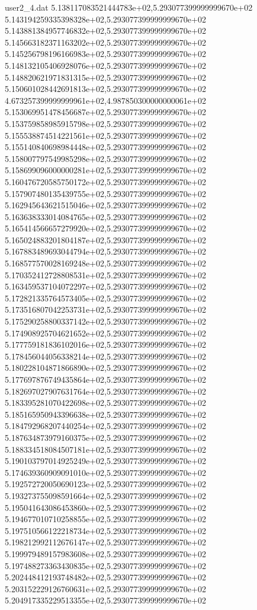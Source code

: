 \begin{filecontents}{user2_4.dat}
5.138117083521444783e+02,5.293077399999999670e+02
5.143194259335398328e+02,5.293077399999999670e+02
5.143881384957746832e+02,5.293077399999999670e+02
5.145663182371163202e+02,5.293077399999999670e+02
5.145256798196166983e+02,5.293077399999999670e+02
5.148132105406928076e+02,5.293077399999999670e+02
5.148820621971831315e+02,5.293077399999999670e+02
5.150601028442691813e+02,5.293077399999999670e+02
4.673257399999999961e+02,4.987850300000000061e+02
5.153069951478456687e+02,5.293077399999999670e+02
5.153759858985915798e+02,5.293077399999999670e+02
5.155538874514221561e+02,5.293077399999999670e+02
5.155140840698984448e+02,5.293077399999999670e+02
5.158007797549985298e+02,5.293077399999999670e+02
5.158699096000000281e+02,5.293077399999999670e+02
5.160476720585750172e+02,5.293077399999999670e+02
5.157907480135439755e+02,5.293077399999999670e+02
5.162945643621515046e+02,5.293077399999999670e+02
5.163638333014084765e+02,5.293077399999999670e+02
5.165414566657279920e+02,5.293077399999999670e+02
5.165024883201804187e+02,5.293077399999999670e+02
5.167883489693044794e+02,5.293077399999999670e+02
5.168577570028169248e+02,5.293077399999999670e+02
5.170352412728808531e+02,5.293077399999999670e+02
5.163459537104072297e+02,5.293077399999999670e+02
5.172821335764573405e+02,5.293077399999999670e+02
5.173516807042253731e+02,5.293077399999999670e+02
5.175290258800337142e+02,5.293077399999999670e+02
5.174908925704621652e+02,5.293077399999999670e+02
5.177759181836102016e+02,5.293077399999999670e+02
5.178456044056338214e+02,5.293077399999999670e+02
5.180228104871866890e+02,5.293077399999999670e+02
5.177697876749435864e+02,5.293077399999999670e+02
5.182697027907631764e+02,5.293077399999999670e+02
5.183395281070422698e+02,5.293077399999999670e+02
5.185165950943396638e+02,5.293077399999999670e+02
5.184792968207440254e+02,5.293077399999999670e+02
5.187634873979160375e+02,5.293077399999999670e+02
5.188334518084507181e+02,5.293077399999999670e+02
5.190103797014925249e+02,5.293077399999999670e+02
5.174639360909091010e+02,5.293077399999999670e+02
5.192572720050690123e+02,5.293077399999999670e+02
5.193273755098591664e+02,5.293077399999999670e+02
5.195041643086453860e+02,5.293077399999999670e+02
5.194677010710258855e+02,5.293077399999999670e+02
5.197510566122218734e+02,5.293077399999999670e+02
5.198212992112676147e+02,5.293077399999999670e+02
5.199979489157983608e+02,5.293077399999999670e+02
5.197488273363430835e+02,5.293077399999999670e+02
5.202448412193748482e+02,5.293077399999999670e+02
5.203152229126760631e+02,5.293077399999999670e+02
5.204917335229513355e+02,5.293077399999999670e+02

\end{filecontents}

